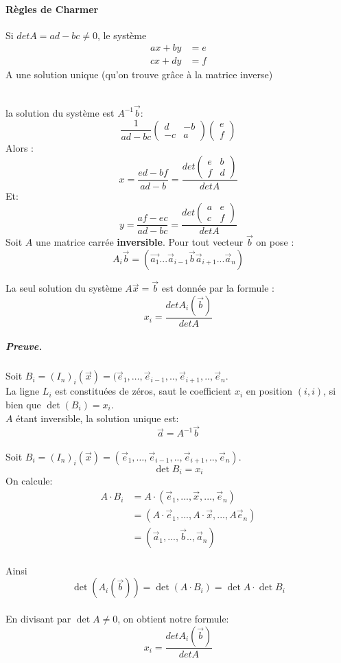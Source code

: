     \paragraph{Règles de Charmer}
    \begin{theoreme}
        
    
    Si $det A = ad-bc \neq 0$, le système
    \begin{align*}
        ax + by &= e\\
        cx + dy &= f
    \end{align*}
    A une solution unique (qu'on trouve grâce à la matrice inverse)
    \end{theoreme}
    \\
    
la solution du système est $A^{-1}\vec{b}$: 
\[\frac{1}{ad -bc}\begin{pmatrix}
    d & -b \\
    -c & a
\end{pmatrix}
\begin{pmatrix}
    e \\
    f
\end{pmatrix}\]
Alors : 
\[x = \frac{ed -bf}{ad -b} =  \frac{det\begin{pmatrix}
    e & b \\
    f & d
\end{pmatrix}} {det A}\]
Et:
\[
y = \frac{af - ec}{ad - bc} = \frac{det \begin{pmatrix}
    a & e \\
    c & f
\end{pmatrix}}{det A}
\]
Soit $A$ une matrice carrée \textbf{inversible}. Pour tout vecteur $\vec{b}$ on pose :
\[A_i\vec{b} = (\vec{a_1}... \vec{a}_{i-1} \vec{b} \vec{a}_{i+ 1} ... \vec{a}_n)\]

    La seul solution du système $A\vec{x} = \vec{b}$ est donnée par la formule : 
    \[
    x_i = \frac{detA_i(\vec{b})}{det A}
    \]
\subparagraph{Preuve.}
Soit $B_i = (I_n)_i(\vec{x}) = (\vec{e}_1,\dots, \vec{e}_{i-1}, .., \vec{e}_{i+1}, .., \vec{e}_n  $.
\\
La ligne $L_i$ est constituées de zéros, saut le coefficient $x_i$ en position $(i, i)$, si bien que $\det (B_i) = x_i$.
\\
$A$ étant inversible, la solution unique est:
\[\vec{a} = A^{-1}\vec{b}\]
\\
Soit $B_i = (I_n)_i(\vec{x}) = (\vec{e}_1,\dots, \vec{e}_{i-1}, .., \vec{e}_{i+1}, .., \vec{e}_n)$.
\\
\[\det B_i = x_i\]
On calcule:
\\
\begin{align*}
A\cdot B_i &= A\cdot(\vec{e}_1, ..., \vec{x}, ..., \vec{e}_n)\\
&= (A\cdot\vec{e}_1, ..., A\cdot\vec{x}, ..., A\vec{e}_n)\\
&= (\vec{a}_1, ..., \vec{b} .., \vec{a}_n)    
\end{align*}
\\
Ainsi \[\det(A_i(\vec{b})) = \det(A\cdot B_i) = \det A \cdot \det B_i\]
\\
En divisant par $\det A \neq 0$, on obtient notre formule:
    \[
    x_i = \frac{detA_i(\vec{b})}{det A}
    \]
